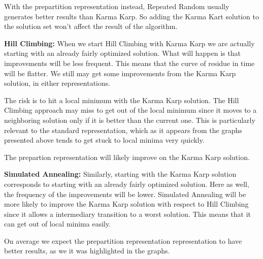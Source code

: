 \documentclass[11pt]{article}
\begin{document}
With the prepartition representation instead, Repeated Random usually generates better results than Karma Karp. So adding the Karma Kart solution to the solution set won't affect the result of the algorithm.



\textbf{Hill Climbing:}
When we start Hill Climbing with Karma Karp we are actually starting with an already fairly optimized solution. What will happen is that improvements will be less frequent. This means that the curve of residue in time will be flatter. We still may get some improvements from the Karma Karp solution, in either representations. 

The risk is to hit a local minimum with the Karma Karp solution. The Hill Climbing approach may miss to get out of the local minimum since it moves to a neighboring solution only if it is better than the current one. This is particularly relevant to the standard representation, which as it appears from the graphs presented above tends to get stuck to local minima very quickly. 

The prepartion representation will likely improve on the Karma Karp solution.



\textbf{Simulated Annealing:}
Similarly, starting with the Karma Karp solution corresponds to starting with an already fairly optimized solution. Here as well, the frequency of the improvements will be lower. Simulated Annealing will be more likely to improve the Karma Karp solution with respect to Hill Climbing since it allows a intermediary transition to a worst solution. This means that it can get  out of local minima easily.

On average we expect the prepartition representation representation to have better results, as we it was highlighted in the graphs.
\end{document}
